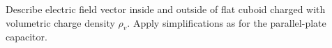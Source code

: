 \begin{Exercise}[difficulty=3]
Describe electric field vector inside and outside of flat cuboid charged with volumetric charge density $\rho_v$. Apply simplifications as for the parallel-plate capacitor. 
\end{Exercise}


